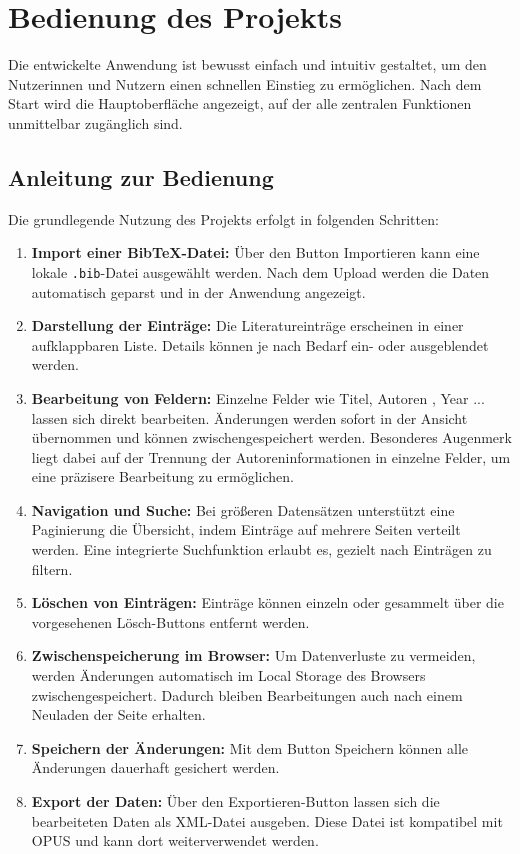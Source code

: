 \section{Bedienung des Projekts}
Die entwickelte Anwendung ist bewusst einfach und intuitiv gestaltet, um den Nutzerinnen und Nutzern einen schnellen Einstieg zu ermöglichen.  
Nach dem Start wird die Hauptoberfläche angezeigt, auf der alle zentralen Funktionen unmittelbar zugänglich sind.  
\subsection*{Anleitung zur Bedienung}
Die grundlegende Nutzung des Projekts erfolgt in folgenden Schritten:
\begin{enumerate}
    \item \textbf{Import einer Bib\TeX{}-Datei:}  
    Über den Button \glqq Importieren\grqq{} kann eine lokale \texttt{.bib}-Datei ausgewählt werden.  
    Nach dem Upload werden die Daten automatisch geparst und in der Anwendung angezeigt.  
    
    \item \textbf{Darstellung der Einträge:}  
    Die Literatureinträge erscheinen in einer aufklappbaren Liste. Details können je nach Bedarf ein- oder ausgeblendet werden.  

    \item \textbf{Bearbeitung von Feldern:}  
    Einzelne Felder wie Titel, Autoren , Year ... lassen sich direkt bearbeiten.  
    Änderungen werden sofort in der Ansicht übernommen und können zwischengespeichert werden.  
    Besonderes Augenmerk liegt dabei auf der Trennung der Autoreninformationen in einzelne Felder, um eine präzisere Bearbeitung zu ermöglichen.  

    \item \textbf{Navigation und Suche:}  
    Bei größeren Datensätzen unterstützt eine Paginierung die Übersicht, indem Einträge auf mehrere Seiten verteilt werden.  
    Eine integrierte Suchfunktion erlaubt es, gezielt nach Einträgen zu filtern.  

    \item \textbf{Löschen von Einträgen:}  
    Einträge können einzeln oder gesammelt über die vorgesehenen Lösch-Buttons entfernt werden.  

    \item \textbf{Zwischenspeicherung im Browser:}  
    Um Datenverluste zu vermeiden, werden Änderungen automatisch im Local Storage des Browsers zwischengespeichert.  
    Dadurch bleiben Bearbeitungen auch nach einem Neuladen der Seite erhalten.  

    \item \textbf{Speichern der Änderungen:}  
    Mit dem Button \glqq Speichern\grqq{} können alle Änderungen dauerhaft gesichert werden.  

    \item \textbf{Export der Daten:}  
    Über den \glqq Exportieren\grqq{}-Button lassen sich die bearbeiteten Daten als XML-Datei ausgeben.  
    Diese Datei ist kompatibel mit OPUS und kann dort weiterverwendet werden.  
\end{enumerate}

